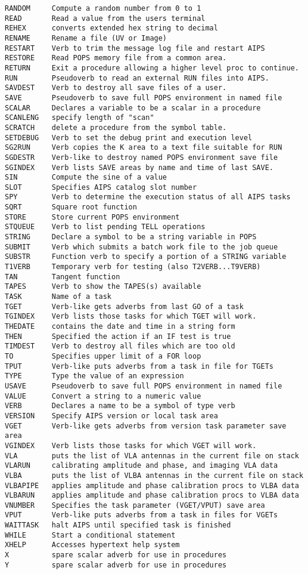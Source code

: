 \begin{verbatim}
RANDOM     Compute a random number from 0 to 1
READ       Read a value from the users terminal
REHEX      converts extended hex string to decimal
RENAME     Rename a file (UV or Image)
RESTART    Verb to trim the message log file and restart AIPS
RESTORE    Read POPS memory file from a common area.
RETURN     Exit a procedure allowing a higher level proc to continue.
RUN        Pseudoverb to read an external RUN files into AIPS.
SAVDEST    Verb to destroy all save files of a user.
SAVE       Pseudoverb to save full POPS environment in named file
SCALAR     Declares a variable to be a scalar in a procedure
SCANLENG   specify length of "scan"
SCRATCH    delete a procedure from the symbol table.
SETDEBUG   Verb to set the debug print and execution level
SG2RUN     Verb copies the K area to a text file suitable for RUN
SGDESTR    Verb-like to destroy named POPS environment save file
SGINDEX    Verb lists SAVE areas by name and time of last SAVE.
SIN        Compute the sine of a value
SLOT       Specifies AIPS catalog slot number
SPY        Verb to determine the execution status of all AIPS tasks
SQRT       Square root function
STORE      Store current POPS environment
STQUEUE    Verb to list pending TELL operations
STRING     Declare a symbol to be a string variable in POPS
SUBMIT     Verb which submits a batch work file to the job queue
SUBSTR     Function verb to specify a portion of a STRING variable
T1VERB     Temporary verb for testing (also T2VERB...T9VERB)
TAN        Tangent function
TAPES      Verb to show the TAPES(s) available
TASK       Name of a task
TGET       Verb-like gets adverbs from last GO of a task
TGINDEX    Verb lists those tasks for which TGET will work.
THEDATE    contains the date and time in a string form
THEN       Specified the action if an IF test is true
TIMDEST    Verb to destroy all files which are too old
TO         Specifies upper limit of a FOR loop
TPUT       Verb-like puts adverbs from a task in file for TGETs
TYPE       Type the value of an expression
USAVE      Pseudoverb to save full POPS environment in named file
VALUE      Convert a string to a numeric value
VERB       Declares a name to be a symbol of type verb
VERSION    Specify AIPS version or local task area
VGET       Verb-like gets adverbs from version task parameter save area
VGINDEX    Verb lists those tasks for which VGET will work.
VLA        puts the list of VLA antennas in the current file on stack
VLARUN     calibrating amplitude and phase, and imaging VLA data
VLBA       puts the list of VLBA antennas in the current file on stack
VLBAPIPE   applies amplitude and phase calibration procs to VLBA data
VLBARUN    applies amplitude and phase calibration procs to VLBA data
VNUMBER    Specifies the task parameter (VGET/VPUT) save area
VPUT       Verb-like puts adverbs from a task in files for VGETs
WAITTASK   halt AIPS until specified task is finished
WHILE      Start a conditional statement
XHELP      Accesses hypertext help system
X          spare scalar adverb for use in procedures
Y          spare scalar adverb for use in procedures
\end{verbatim}\eve

